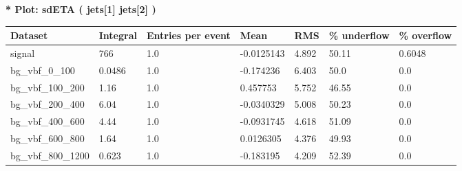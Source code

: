 \documentclass[a4paper, 10pt]{article}
\begin{document}
\textbf{* Plot: sdETA ( jets[1] jets[2] ) }\\
   \begin{table}[H]
  \begin{center}
    \begin{tabular}{|m{23.0mm}|m{23.0mm}|m{18.0mm}|m{19.0mm}|m{19.0mm}|m{19.0mm}|m{19.0mm}|}
      \hline
      {\cellcolor{yellow}         Dataset}& {\cellcolor{yellow}         Integral}& {\cellcolor{yellow}         Entries per event}& {\cellcolor{yellow}         Mean}& {\cellcolor{yellow}         RMS}& {\cellcolor{yellow}         \% underflow}& {\cellcolor{yellow}         \% overflow}\\
      \hline
      {\cellcolor{white}         signal}& {\cellcolor{white}         766}& {\cellcolor{white}         1.0}& {\cellcolor{white}         -0.0125143}& {\cellcolor{white}         4.892}& {\cellcolor{red}         50.11}& {\cellcolor{red}         0.6048}\\
      \hline
      {\cellcolor{white}         bg\_vbf\_0\_100}& {\cellcolor{white}         0.0486}& {\cellcolor{white}         1.0}& {\cellcolor{white}         -0.174236}& {\cellcolor{white}         6.403}& {\cellcolor{red}         50.0}& {\cellcolor{red}         0.0}\\
      \hline
      {\cellcolor{white}         bg\_vbf\_100\_200}& {\cellcolor{white}         1.16}& {\cellcolor{white}         1.0}& {\cellcolor{white}         0.457753}& {\cellcolor{white}         5.752}& {\cellcolor{red}         46.55}& {\cellcolor{red}         0.0}\\
      \hline
      {\cellcolor{white}         bg\_vbf\_200\_400}& {\cellcolor{white}         6.04}& {\cellcolor{white}         1.0}& {\cellcolor{white}         -0.0340329}& {\cellcolor{white}         5.008}& {\cellcolor{red}         50.23}& {\cellcolor{red}         0.0}\\
      \hline
      {\cellcolor{white}         bg\_vbf\_400\_600}& {\cellcolor{white}         4.44}& {\cellcolor{white}         1.0}& {\cellcolor{white}         -0.0931745}& {\cellcolor{white}         4.618}& {\cellcolor{red}         51.09}& {\cellcolor{red}         0.0}\\
      \hline
      {\cellcolor{white}         bg\_vbf\_600\_800}& {\cellcolor{white}         1.64}& {\cellcolor{white}         1.0}& {\cellcolor{white}         0.0126305}& {\cellcolor{white}         4.376}& {\cellcolor{red}         49.93}& {\cellcolor{red}         0.0}\\
      \hline
      {\cellcolor{white}         bg\_vbf\_800\_1200}& {\cellcolor{white}         0.623}& {\cellcolor{white}         1.0}& {\cellcolor{white}         -0.183195}& {\cellcolor{white}         4.209}& {\cellcolor{red}         52.39}& {\cellcolor{red}         0.0}\\

\end{tabular}
\end{center}
\end{table}
\end{document}
